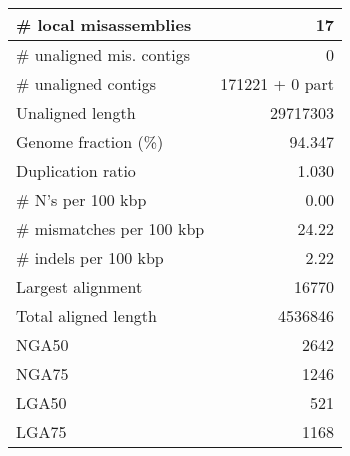 \documentclass[12pt,a4paper]{article}
\begin{document}
\begin{table}[ht]
\begin{center}
\begin{tabular}{|l*{1}{|r}|}
\# local misassemblies & 17 \\ \hline
\# unaligned mis. contigs & 0 \\ \hline
\# unaligned contigs & 171221 + 0 part \\ \hline
Unaligned length & 29717303 \\ \hline
Genome fraction (\%) & 94.347 \\ \hline
Duplication ratio & 1.030 \\ \hline
\# N's per 100 kbp & 0.00 \\ \hline
\# mismatches per 100 kbp & 24.22 \\ \hline
\# indels per 100 kbp & 2.22 \\ \hline
Largest alignment & 16770 \\ \hline
Total aligned length & 4536846 \\ \hline
NGA50 & 2642 \\ \hline
NGA75 & 1246 \\ \hline
LGA50 & 521 \\ \hline
LGA75 & 1168 \\ \hline
\end{tabular}
\end{center}
\end{table}
\end{document}
